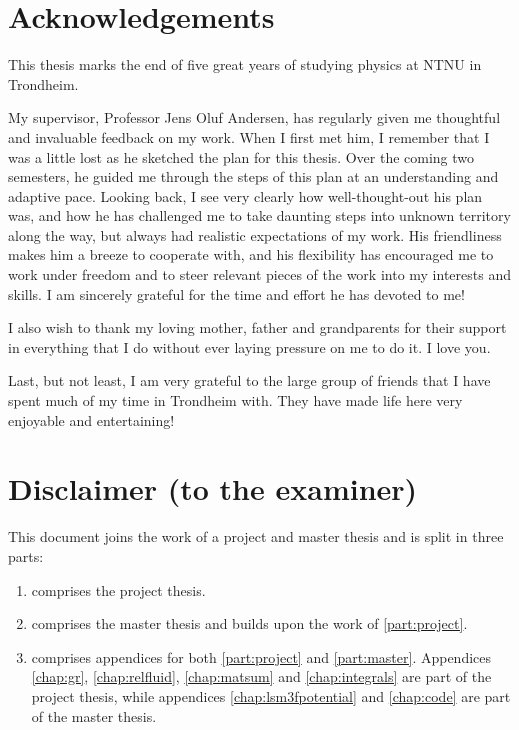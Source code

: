 \chapter*{Acknowledgements}

This thesis marks the end of five great years of studying physics at NTNU in Trondheim.

My supervisor, Professor Jens Oluf Andersen,
has regularly given me thoughtful and invaluable feedback on my work.
When I first met him,
I remember that I was a little lost as he sketched the plan for this thesis.
Over the coming two semesters, he guided me through the steps of this plan at an understanding and adaptive pace.
Looking back, I see very clearly how well-thought-out his plan was,
and how he has challenged me to take daunting steps into unknown territory along the way,
but always had realistic expectations of my work.
His friendliness makes him a breeze to cooperate with,
and his flexibility has encouraged me to work under freedom and to steer relevant pieces of the work into my interests and skills.
I am sincerely grateful for the time and effort he has devoted to me!

I also wish to thank my loving mother, father and grandparents
for their support in everything that I do
without ever laying pressure on me to do it.
I love you.

Last, but not least, I am very grateful to the large group of friends that I have spent much of my time in Trondheim with.
They have made life here very enjoyable and entertaining!


{\let\clearpage\relax\chapter*{Disclaimer (to the examiner)}}

This document joins the work of a project and master thesis and is split in three parts:
\begin{enumerate}
\item {} comprises the project thesis.
\item {} comprises the master thesis and builds upon the work of \cref{part:project}.
\item {} comprises appendices for both \cref{part:project} and \cref{part:master}.
      Appendices \ref{chap:gr}, \ref{chap:relfluid}, \ref{chap:matsum} and \ref{chap:integrals} are part of the project thesis,
      while appendices \ref{chap:lsm3fpotential} and \ref{chap:code} are part of the master thesis.
\end{enumerate}

